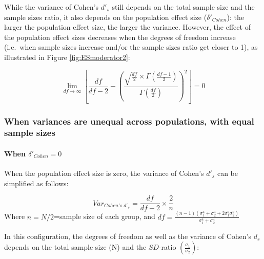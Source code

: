 \documentclass[
  man]{apa6}
\begin{document}
While the variance of Cohen's \(d'_s\) still depends on the total sample size and the sample sizes ratio, it also depends on the population effect size (\(\delta'_{Cohen}\)): the larger the population effect size, the larger the variance. However, the effect of the population effect sizes decreases when the degrees of freedom increase (i.e.~when sample sizes increase and/or the sample sizes ratio get closer to 1), as illustrated in Figure \ref{fig:ESmoderator2}:

\[\lim_{df\rightarrow \infty}\left[\frac{df}{df-2} - \left( \frac{\sqrt{\frac{df}{2}} \times \Gamma \left(\frac{df-1}{2} \right)}{\Gamma \left( \frac{df}{2}\right)}\right)^2 \right]=0\]

\hypertarget{when-variances-are-unequal-across-populations-with-equal-sample-sizes-1}{%
\subsubsection{When variances are unequal across populations, with equal sample sizes}\label{when-variances-are-unequal-across-populations-with-equal-sample-sizes-1}}

\hypertarget{when-delta_cohen0-2}{%
\paragraph{\texorpdfstring{When \(\delta'_{Cohen}=0\)}{When \textbackslash delta'\_\{Cohen\}=0}}\label{when-delta_cohen0-2}}

When the population effect size is zero, the variance of Cohen's \(d'_s\) can be simplified as follows:

\[Var_{Cohen's \; d'_s} = \frac{df}{df-2} \times \frac{2}{n}\]
Where \(n=N/2\)=sample size of each group, and \(df=\frac{(n-1)(\sigma^4_1+\sigma^4_2+2\sigma^2_1\sigma^2_2)}{\sigma^4_1+\sigma^4_2}\)

In this configuration, the degrees of freedom as well as the variance of Cohen's \(d_s\) depends on the total sample size (N) and the \(SD\)-ratio \(\left( \frac{\sigma_1}{\sigma_2}\right)\):
\end{document}
